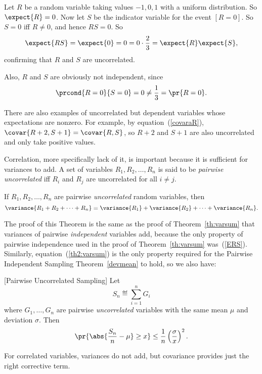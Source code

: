 \begin{example}
Let $R$ be a random variable taking values $-1, 0, 1$ with a uniform
distribution.  So $\expect{R} =0$.  Now let $S$ be the indicator variable
for the event $[R = 0]$.  So $S=0$ iff $R \neq 0$, and hence $RS = 0$.  So
\[
\expect{RS} = \expect{0} = 0 = 0 \cdot \frac{2}{3} = \expect{R}\expect{S},
\]
confirming that $R$ and $S$ are uncorrelated.

Also, $R$ and $S$ are obviously not independent, since
\[
\prcond{R=0}{S=0} = 0 \neq \frac{1}{3} = \pr{R=0}.
\]

There are also examples of uncorrelated but dependent variables whose
expectations are nonzero.  For example, by equation~(\ref{covaraR}),
$\covar{R+2,S+1} = \covar{R,S}$, so $R+2$ and $S+1$ are also uncorrelated
and only take positive values.
\end{example}

Correlation, more specifically lack of it, is important because it is
sufficient for variances to add.  A set of variables $R_1, R_2, \ldots,
R_n$ is said to be \emph{pairwise uncorrelated} iff $R_i$ and $R_j$ are
uncorrelated for all $i \neq j$.

\begin{theorem}
If $R_1, R_2, \ldots, R_n$ are pairwise \emph{uncorrelated} random
variables, then
\begin{equation}\label{th2:varsum}
\variance{R_1 + R_2 + \cdots + R_n} = \variance{R_1} + \variance{R_2} +
  \cdots + \variance{R_n}.
\end{equation}
\end{theorem}

The proof of this Theorem is the same as the proof of
Theorem~\ref{th:varsum} that variances of pairwise \emph{independent}
variables add, because the only property of pairwise independence used in
the proof of Theorem~\ref{th:varsum} was~(\ref{ERS}).  Similarly,
equation~(\ref{th2:varsum}) is the only property required for the Pairwise
Independent Sampling Theorem~\ref{devmean} to hold, so we also have:
\begin{corollary}
\label{uncorsample}[Pairwise Uncorrelated Sampling]
Let
\[
S_n \eqdef \sum_{i=1}^n G_i
\]
where $G_1, \dots, G_n$ are pairwise \emph{uncorrelated} variables with
the same mean $\mu$ and deviation $\sigma$.  Then
\begin{equation}\label{Snx}
\pr{\abs{\frac{S_n}{n} - \mu} \geq x} \leq \frac{1}{n}
\left(\frac{\sigma}{x}\right)^2.
\end{equation}
\end{corollary}

For correlated variables, variances do not add, but covariance
provides just the right corrective term.

\begin{theorem}[General Variance Additivity}
For any random variables $R,S$, 
\begin{equation}\label{vr+scov}
\end{equation}
\variance{R + S} = \variance{R} + \variancef{S} + 2\covariance{R,S}.
\end{theorem}

